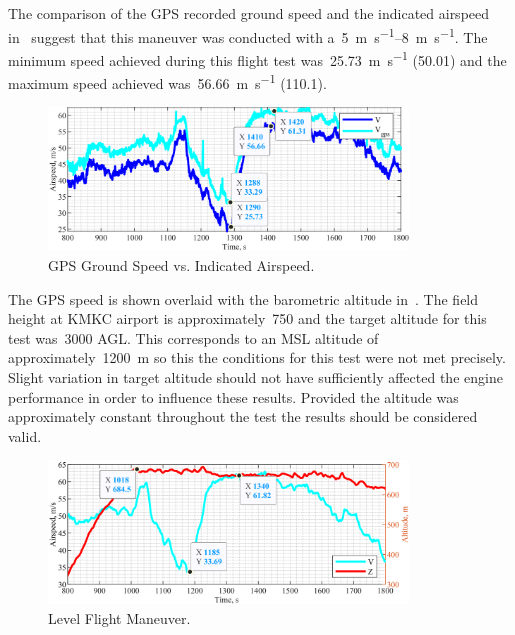 \documentclass[conf]{new-aiaa}
\begin{document}
The comparison of the GPS recorded ground speed and the indicated airspeed in~ suggest that this maneuver was conducted with a~\SIrange{5}{8}{\meter\per\second}. The minimum speed achieved during this flight test was~\SI{25.73}{\meter\per\second} (\SI{50.01}{\kts}) and the maximum speed achieved was~\SI{56.66}{\meter\per\second} (\SI{110.1}{\kts}).

\begin{figure}[htp!]
\centering
	\includegraphics[height=1.5in]{GPSSpeedComparison.png}
	\caption{GPS Ground Speed vs. Indicated Airspeed.}
	\label{gpsspeedcomparison}
\end{figure}

The GPS speed is shown overlaid with the barometric altitude in~. The field height at KMKC airport is approximately~\SI{750}{\foot} and the target altitude for this test was~\SI{3000}{\foot} AGL. This corresponds to an MSL altitude of approximately~\SI{1200}{\meter} so this the conditions for this test were not met precisely. Slight variation in target altitude should not have sufficiently affected the engine performance in order to influence these results. Provided the altitude was approximately constant throughout the test the results should be considered valid.

\begin{figure}[htp!]
\centering
	\includegraphics[height=1.5in]{LevelFlightPower.png}
	\caption{Level Flight Maneuver.}
	\label{levelflightmaneuver}
\end{figure}
\end{document}
